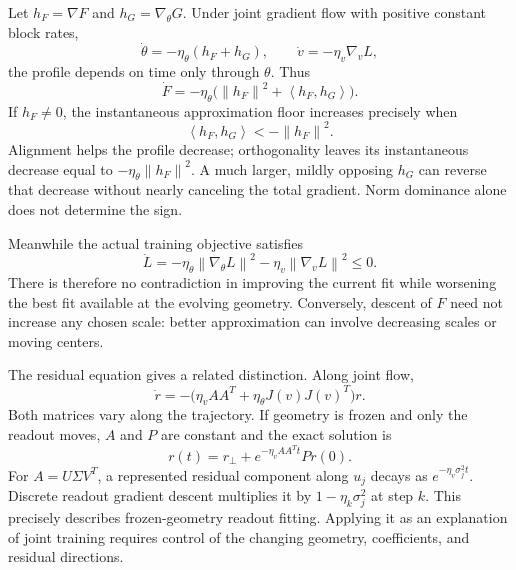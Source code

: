 \documentclass[11pt]{article}
\theoremstyle{remark}
\newcommand{\norm}[1]{\left\lVert #1\right\rVert}
\newcommand{\ip}[2]{\left\langle #1,#2\right\rangle}
\begin{document}
Let $h_F=\nabla F$ and $h_G=\nabla_\theta G$. Under joint gradient flow with positive constant block rates,
\begin{equation}
 \dot\theta=-\eta_\theta(h_F+h_G),\qquad
 \dot v=-\eta_v\nabla_vL,
\end{equation}
the profile depends on time only through $\theta$. Thus
\begin{equation}
 \boxed{\dot F=-\eta_\theta\bigl(\norm{h_F}^2+\ip{h_F}{h_G}\bigr).}
 \label{eq:Fdot}
\end{equation}
If $h_F\ne0$, the instantaneous approximation floor increases precisely when
\begin{equation}
 \ip{h_F}{h_G}<-\norm{h_F}^2.
\end{equation}
Alignment helps the profile decrease; orthogonality leaves its instantaneous decrease equal to $-\eta_\theta\norm{h_F}^2$. A much larger, mildly opposing $h_G$ can reverse that decrease without nearly canceling the total gradient. Norm dominance alone does not determine the sign.

Meanwhile the actual training objective satisfies
\begin{equation}
 \dot L=-\eta_\theta\norm{\nabla_\theta L}^2
          -\eta_v\norm{\nabla_vL}^2\leq0.
\end{equation}
There is therefore no contradiction in improving the current fit while worsening the best fit available at the evolving geometry. Conversely, descent of $F$ need not increase any chosen scale: better approximation can involve decreasing scales or moving centers.

The residual equation gives a related distinction. Along joint flow,
\begin{equation}
 \dot r=-\bigl(\eta_vAA^T+\eta_\theta J(v)J(v)^T\bigr)r.
 \label{eq:joint-r}
\end{equation}
Both matrices vary along the trajectory. If geometry is frozen and only the readout moves, $A$ and $P$ are constant and the exact solution is
\begin{equation}
 r(t)=r_\perp+e^{-\eta_v AA^Tt}Pr(0).
 \label{eq:frozen-readout}
\end{equation}
For $A=U\Sigma V^T$, a represented residual component along $u_j$ decays as $e^{-\eta_v\sigma_j^2t}$. Discrete readout gradient descent multiplies it by $1-\eta_k\sigma_j^2$ at step $k$. This precisely describes frozen-geometry readout fitting. Applying it as an explanation of joint training requires control of the changing geometry, coefficients, and residual directions.
\end{document}
